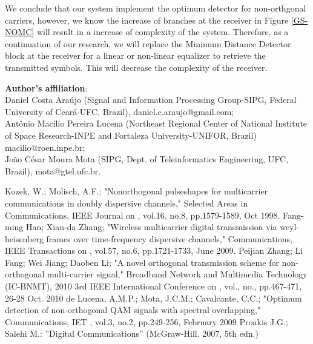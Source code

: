 \documentclass[twocolumn]{el-author}
\begin{document}
We conclude that our system implement the optimum detector for non-orthgonal carriers, however, we know the increase of branches at the receiver in Figure \ref{GS-NOMC} will result in a increase of complexity of the system. Therefore, as a continuation of our research,  we will replace the Minimum Distance Detector block at the receiver for a linear or non-linear equalizer to retrieve the transmitted symbols. This will decrease the complexity of the receiver.


\vskip5pt
\noindent \textbf{Author's affiliation}:\\
\noindent Daniel Costa Ara\'ujo (Signal and Information Processing Group-SIPG, Federal University of Cear\'a-UFC, Brazil), daniel.c.araujo@gmail.com;\\
\noindent Ant\^onio Macilio Pereira Lucena (Northeast Regional Center of
National Institute of Space Research-INPE and Fortaleza University-UNIFOR, Brazil) macilio@roen.inpe.br;\\
\noindent Jo\~ao C\'esar Moura Mota (SIPG, Dept. of Teleinformatics Engineering, UFC, Brazil), mota@gtel.ufc.br.




\begin{thebibliography}{}

Kozek, W.; Molisch, A.F.;  "Nonorthogonal pulseshapes for multicarrier communications in doubly dispersive channels," Selected Areas in Communications, IEEE Journal on , vol.16, no.8, pp.1579-1589, Oct 1998.
Fang-ming Han; Xian-da Zhang;  "Wireless multicarrier digital transmission via weyl-heisenberg frames over time-frequency dispersive channels," Communications, IEEE Transactions on , vol.57, no.6, pp.1721-1733, June 2009.
Peijian Zhang; Li Fang; Wei Jiang; Daoben Li; "A novel orthogonal transmission scheme for non-orthogonal multi-carrier signal," Broadband Network and Multimedia Technology (IC-BNMT), 2010 3rd IEEE International Conference on , vol., no., pp.467-471, 26-28 Oct. 2010
de Lucena, A.M.P.; Mota, J.C.M.; Cavalcante, C.C.;  "Optimum detection of non-orthogonal QAM signals with spectral overlapping," Communications, IET , vol.3, no.2, pp.249-256, February 2009
Proakis J.G.; Salehi M.: ''Digital Communications'' (McGraw-Hill, 2007, 5th edn.)
\end{thebibliography}
\end{document}
